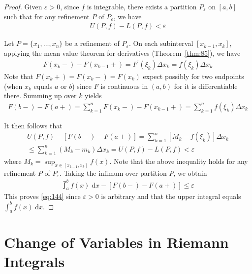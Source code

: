 \documentclass[thmcnt=section, 12pt]{my-elegantbook}
\begin{document}
\begin{proof}
	Given $\varepsilon > 0$, since $f$ is integrable,
	there exists a partition $P_\varepsilon$ on $[a, b]$
	such that for any refinement $P$ of $P_\varepsilon$,
	we have 
	\begin{align*}
		U(P,f) - L(P,f) < \varepsilon
	\end{align*}

	Let $P=\{x_1, \ldots, x_n\}$ be a refinement of $P_\varepsilon$.
	On each subinterval $[x_{k-1}, x_k]$,
	applying the mean value theorem for derivatives 
	(Theorem~\ref{thm:85}),
	we have 
	\begin{align*}
		F(x_k -) - F(x_{k-1} +)
		= F^\prime(\xi_k) \Delta x_k
		= f(\xi_k) \Delta x_k
	\end{align*}
	Note that $F(x_k +) = F(x_k - ) = F(x_k)$ expect possibly
	for two endpoints (when $x_k$ equals $a$ or $b$)
	since $F$ is continuous in $(a, b)$
	for it is differentiable there.
	Summing up over $k$ yields
	\begin{align*}
		F(b-) - F(a+)
		= \sum_{k=1}^n F(x_{k} - ) - F(x_{k-1} + )
		= \sum_{k=1}^n f(\xi_k) \Delta x_k
	\end{align*}

	It then follows that 
	\begin{multline*}
		U(P,f) - [F(b-) - F(a+)]
		= \sum_{k=1}^n [M_k - f(\xi_k)] \Delta x_k \\
		\leq \sum_{k=1}^n (M_k - m_k) \Delta x_k
		= U(P,f) - L(P,f)
		< \varepsilon
	\end{multline*}
	where $M_k = \sup_{x \in [x_{k-1}, x_k]} f(x)$.
	Note that the above inequality
	holds for any refinement $P$ of $P_\varepsilon$.
	Taking the infimum over partition $P$, we obtain
	\begin{align*}
		\upint_a^b f(x) \; \mathrm{d} x 
		- [F(b-) - F(a+)]
		\leq \varepsilon
	\end{align*}
	This proves \eqref{eq:144} since $\varepsilon > 0$
	is arbitrary
	and that the upper integral 
	equals $\int_a^b f(x) \; \mathrm{d} x$.
\end{proof}


\section{Change of Variables in Riemann Integrals}

\end{document}
